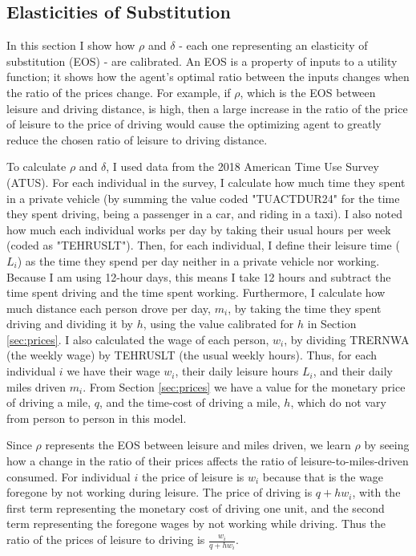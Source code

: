 \documentclass[letter, 12pt, epsf,leqno]{article}
\begin{document}
\subsection{Elasticities of Substitution}

In this section I show how $\rho$ and $\delta$ - each one representing an elasticity of substitution (EOS) - are calibrated.  An EOS is a property of inputs to a utility function; it shows how the agent's optimal ratio between the inputs changes when the ratio of the prices change.  For example, if $\rho$, which is the EOS between leisure and driving distance, is high, then a large increase in the ratio of the price of leisure to the price of driving would cause the optimizing agent to greatly reduce the chosen ratio of leisure to driving distance.

To calculate $\rho$ and $\delta$, I used data from the 2018 American Time Use Survey (ATUS).  For each individual in the survey, I calculate how much time they spent in a private vehicle (by summing the value coded "TUACTDUR24" for the time they spent driving, being a passenger in a car, and riding in a taxi).  I also noted how much each individual works per day by taking their usual hours per week (coded as "TEHRUSLT").  Then, for each individual, I define their leisure time ($L_i$) as the time they spend per day neither in a private vehicle nor working.  Because I am using 12-hour days, this means I take 12 hours and subtract the time spent driving and the time spent working.  Furthermore, I calculate how much distance each person drove per day, $m_i$, by taking the time they spent driving and dividing it by $h$, using the value calibrated for $h$ in Section \ref{sec:prices}.  I also calculated the wage of each person, $w_i$, by dividing TRERNWA (the weekly wage) by TEHRUSLT (the usual weekly hours).  Thus, for each individual $i$ we have their wage $w_i$, their daily leisure hours $L_i$, and their daily miles driven $m_i$.  From Section \ref{sec:prices} we have a value for the monetary price of driving a mile, $q$, and the time-cost of driving a mile, $h$, which do not vary from person to person in this model.

Since $\rho$ represents the EOS between leisure and miles driven, we learn $\rho$ by seeing how a change in the ratio of their prices affects the ratio of leisure-to-miles-driven consumed.  For individual $i$ the price of leisure is $w_i$ because that is the wage foregone by not working during leisure.  The price of driving is $q+hw_i$, with the first term representing the monetary cost of driving one unit, and the second term representing the foregone wages by not working while driving.  Thus the ratio of the prices of leisure to driving is $\frac{w_i}{q+hw_i}$. 
\end{document}
